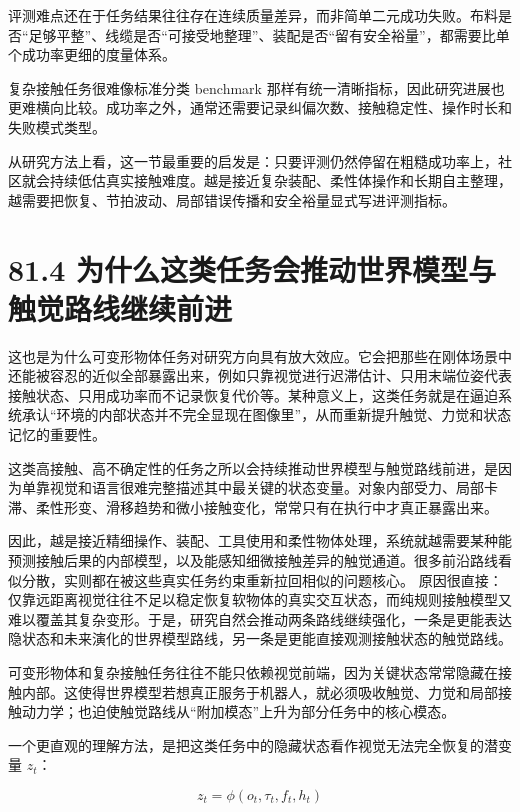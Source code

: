 评测难点还在于任务结果往往存在连续质量差异，而非简单二元成功失败。布料是否“足够平整”、线缆是否“可接受地整理”、装配是否“留有安全裕量”，都需要比单个成功率更细的度量体系。

复杂接触任务很难像标准分类 benchmark 那样有统一清晰指标，因此研究进展也更难横向比较。成功率之外，通常还需要记录纠偏次数、接触稳定性、操作时长和失败模式类型。

从研究方法上看，这一节最重要的启发是：只要评测仍然停留在粗糙成功率上，社区就会持续低估真实接触难度。越是接近复杂装配、柔性体操作和长期自主整理，越需要把恢复、节拍波动、局部错误传播和安全裕量显式写进评测指标。

\section*{81.4 为什么这类任务会推动世界模型与触觉路线继续前进}


这也是为什么可变形物体任务对研究方向具有放大效应。它会把那些在刚体场景中还能被容忍的近似全部暴露出来，例如只靠视觉进行迟滞估计、只用末端位姿代表接触状态、只用成功率而不记录恢复代价等。某种意义上，这类任务就是在逼迫系统承认“环境的内部状态并不完全显现在图像里”，从而重新提升触觉、力觉和状态记忆的重要性。

这类高接触、高不确定性的任务之所以会持续推动世界模型与触觉路线前进，是因为单靠视觉和语言很难完整描述其中最关键的状态变量。对象内部受力、局部卡滞、柔性形变、滑移趋势和微小接触变化，常常只有在执行中才真正暴露出来。

因此，越是接近精细操作、装配、工具使用和柔性物体处理，系统就越需要某种能预测接触后果的内部模型，以及能感知细微接触差异的触觉通道。很多前沿路线看似分散，实则都在被这些真实任务约束重新拉回相似的问题核心。 原因很直接：仅靠远距离视觉往往不足以稳定恢复软物体的真实交互状态，而纯规则接触模型又难以覆盖其复杂变形。于是，研究自然会推动两条路线继续强化，一条是更能表达隐状态和未来演化的世界模型路线，另一条是更能直接观测接触状态的触觉路线。

可变形物体和复杂接触任务往往不能只依赖视觉前端，因为关键状态常常隐藏在接触内部。这使得世界模型若想真正服务于机器人，就必须吸收触觉、力觉和局部接触动力学；也迫使触觉路线从“附加模态”上升为部分任务中的核心模态。

一个更直观的理解方法，是把这类任务中的隐藏状态看作视觉无法完全恢复的潜变量 \(z_t\)：

\begin{equation*}
z_t = \phi(o_t, \tau_t, f_t, h_t)
\end{equation*}


